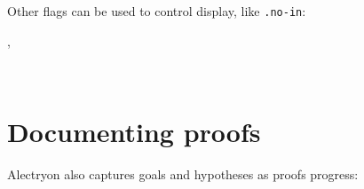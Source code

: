 \documentclass[a4paper]{article}
\begin{document}
Other flags can be used to control display, like \texttt{.no-in}:

\begin{alectryon}
  \sep
  \begin{sentence}
    \begin{output}
      \begin{messages}
        \begin{message}
          ~~~~~~~\nl
          \nl
          ~~~~~~~~~~~~~\nl
          ~~~~~~~~~~~~~
        \end{message}
      \end{messages}
    \end{output}
  \end{sentence}
\end{alectryon}


\section{Documenting proofs%
  \label{documenting-proofs}%
}

Alectryon also captures goals and hypotheses as proofs progress:
\end{document}
